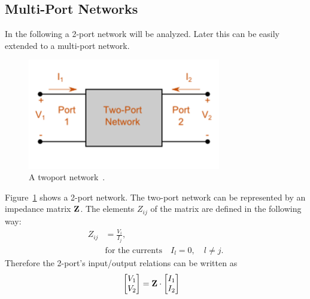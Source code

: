 \subsection{Multi-Port Networks}
\label{sec:multiport_networks}

In the following a 2-port network will be analyzed.
Later this can be easily extended to a multi-port network.
\begin{figure}[h]
\begin{center}
\includegraphics[width=0.75\textwidth]{images/twoport.png}
\caption{A twoport network~\cite{magnus:twoport}.}
\label{fig:twoport}
\end{center}
\end{figure}

Figure~\ref{fig:twoport} shows a 2-port network.
The two-port network can be represented by an impedance matrix $\mathbf{Z}$.
The elements $Z_{ij}$ of the matrix are defined in the following way:
\begin{align}
\label{eq:multiport_impedance}
Z_{ij} &= \frac{V_i}{I_j},\\\nonumber
&\text{for the currents}\quad I_l = 0,\quad l\neq j.
\end{align}
Therefore the 2-port's input/output relations can be written as
\begin{align}
\label{eq:twoport_io}
\begin{bmatrix}
V_1\\V_2
\end{bmatrix} &= \mathbf{Z} \cdot
\begin{bmatrix}
I_1\\I_2
\end{bmatrix}
\end{align}

